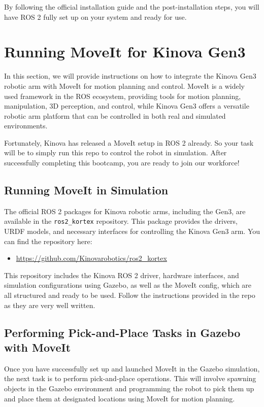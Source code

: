 \documentclass{article}
\begin{document}
By following the official installation guide and the post-installation steps, you will have ROS 2 fully set up on your system and ready for use.

\section{Running MoveIt for Kinova Gen3}
In this section, we will provide instructions on how to integrate the Kinova Gen3 robotic arm with MoveIt for motion planning and control. MoveIt is a widely used framework in the ROS ecosystem, providing tools for motion planning, manipulation, 3D perception, and control, while Kinova Gen3 offers a versatile robotic arm platform that can be controlled in both real and simulated environments.

Fortunately, Kinova has released a MoveIt setup in ROS 2 already. So your task will be to simply run this repo to control the robot in simulation. After successfully completing this bootcamp, you are ready to join our workforce!

\subsection{Running MoveIt in Simulation}
The official ROS 2 packages for Kinova robotic arms, including the Gen3, are available in the \texttt{ros2\_kortex} repository. This package provides the drivers, URDF models, and necessary interfaces for controlling the Kinova Gen3 arm. You can find the repository here:
\begin{itemize}
    \item \url{https://github.com/Kinovarobotics/ros2_kortex}
\end{itemize}

This repository includes the Kinova ROS 2 driver, hardware interfaces, and simulation configurations using Gazebo, as well as the MoveIt config, which are all structured and ready to be used. Follow the instructions provided in the repo as they are very well written. 

\subsection{Performing Pick-and-Place Tasks in Gazebo with MoveIt}
Once you have successfully set up and launched MoveIt in the Gazebo simulation, the next task is to perform pick-and-place operations. This will involve spawning objects in the Gazebo environment and programming the robot to pick them up and place them at designated locations using MoveIt for motion planning.
\end{document}
